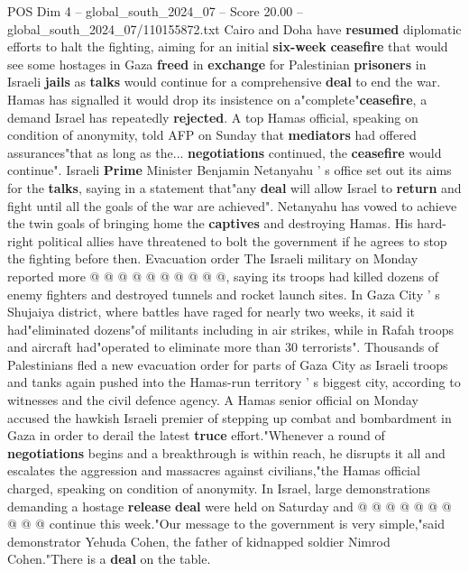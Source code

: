 \begin{textsample}{POS Dim 4 – global\_south\_2024\_07 – Score 20.00 – global\_south\_2024\_07/110155872.txt}  \label{ex:f4_pos_120}
Cairo and Doha have \textbf{resumed} diplomatic efforts to halt the fighting, aiming for an initial \textbf{six-week} \textbf{ceasefire} that would see some hostages in Gaza \textbf{freed} in \textbf{exchange} for Palestinian \textbf{prisoners} in Israeli \textbf{jails} as \textbf{talks} would continue for a comprehensive \textbf{deal} to end the war.
Hamas has signalled it would drop its insistence on a"complete"\textbf{ceasefire}, a demand Israel has repeatedly \textbf{rejected}.
A top Hamas official, speaking on condition of anonymity, told AFP on Sunday that \textbf{mediators} had offered assurances"that as long as the... \textbf{negotiations} continued, the \textbf{ceasefire} would continue".
Israeli \textbf{Prime} Minister Benjamin Netanyahu ' s office set out its aims for the \textbf{talks}, saying in a statement that"any \textbf{deal} will allow Israel to \textbf{return} and fight until all the goals of the war are achieved".
Netanyahu has vowed to achieve the twin goals of bringing home the \textbf{captives} and destroying Hamas.
His hard-right political allies have threatened to bolt the government if he agrees to stop the fighting before then.
Evacuation order The Israeli military on Monday reported more @ @ @ @ @ @ @ @ @ @, saying its troops had killed dozens of enemy fighters and destroyed tunnels and rocket launch sites.
In Gaza City ' s Shujaiya district, where battles have raged for nearly two weeks, it said it had"eliminated dozens"of militants including in air strikes, while in Rafah troops and aircraft had"operated to eliminate more than 30 terrorists".
Thousands of Palestinians fled a new evacuation order for parts of Gaza City as Israeli troops and tanks again pushed into the Hamas-run territory ' s biggest city, according to witnesses and the civil defence agency.
A Hamas senior official on Monday accused the hawkish Israeli premier of stepping up combat and bombardment in Gaza in order to derail the latest \textbf{truce} effort."Whenever a round of \textbf{negotiations} begins and a breakthrough is within reach, he disrupts it all and escalates the aggression and massacres against civilians,"the Hamas official charged, speaking on condition of anonymity.
In Israel, large demonstrations demanding a hostage \textbf{release} \textbf{deal} were held on Saturday and @ @ @ @ @ @ @ @ @ @ continue this week."Our message to the government is very simple,"said demonstrator Yehuda Cohen, the father of kidnapped soldier Nimrod Cohen."There is a \textbf{deal} on the table.

\end{textsample}
